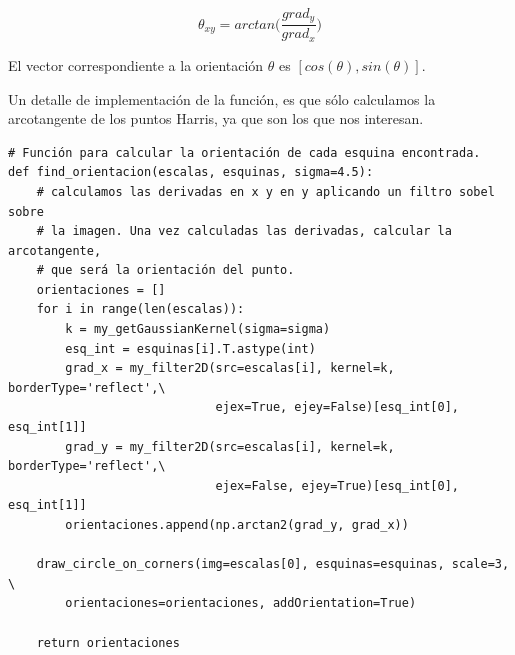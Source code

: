 \documentclass[11pt,a4paper]{article}
\theoremstyle{plain}
\theoremstyle{definition}
\begin{document}
\begin{displaymath}
\theta_{xy} = arctan \Bigg ( \frac{grad_y}{grad_x} \Bigg)
\end{displaymath}

El vector correspondiente a la orientación $\theta$ es $[cos(\theta), sin(\theta)]$. 

Un detalle de implementación de la función, es que sólo calculamos la arcotangente de los puntos Harris, ya que son los que nos interesan.

\begin{verbatim}
# Función para calcular la orientación de cada esquina encontrada.
def find_orientacion(escalas, esquinas, sigma=4.5):
    # calculamos las derivadas en x y en y aplicando un filtro sobel sobre 
    # la imagen. Una vez calculadas las derivadas, calcular la arcotangente, 
    # que será la orientación del punto.
    orientaciones = []
    for i in range(len(escalas)):
        k = my_getGaussianKernel(sigma=sigma)
        esq_int = esquinas[i].T.astype(int)
        grad_x = my_filter2D(src=escalas[i], kernel=k, borderType='reflect',\
                             ejex=True, ejey=False)[esq_int[0], esq_int[1]]
        grad_y = my_filter2D(src=escalas[i], kernel=k, borderType='reflect',\
                             ejex=False, ejey=True)[esq_int[0], esq_int[1]]
        orientaciones.append(np.arctan2(grad_y, grad_x))

    draw_circle_on_corners(img=escalas[0], esquinas=esquinas, scale=3, \
        orientaciones=orientaciones, addOrientation=True)

    return orientaciones
\end{verbatim}
\end{document}
